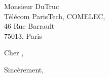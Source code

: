 \documentclass[
   version=last,
   NF, %
   visualize,
   firsthead=true,
   fromemail, fromphone,
   refline=dateleft,
   backaddress=false,
   foldmarks=false,
   parskip=full-
]{scrlttr2}
\begin{document}
\begin{letter} {%
      Monsieur DuTruc\\
      Télécom ParisTech, COMELEC,\\
      46 Rue Barrault\\75013, Paris
   }

   \opening{Cher ,}

   \setcounter{blindtext}{3}
   \Blindtext[4][1]

   \closing{Sincèrement,}


\end{letter}
\end{document}
